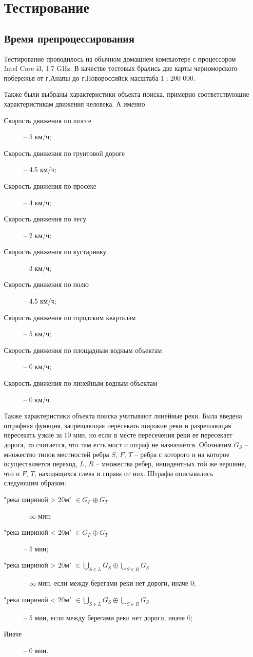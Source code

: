 \chapter{Тестирование}

\section{Время препроцессирования}

Тестирование проводилось на обычном домашнем компьютере
с процессором Intel Core i3, 1.7 GHz. В качестве тестовых
брались две карты черноморского побережья от г.Анапы до г.Новороссийск
масштаба 1 : 200 000.

Также были выбраны характеристики объекта поиска, примерно соответствующие
характеристикам движения человека. А именно
\begin{description}
\item[Скорость движения по шоссе] -- 5 км/ч;
\item[Скорость движения по грунтовой дороге] -- 4.5 км/ч;
\item[Скорость движения по просеке] -- 4 км/ч;
\item[Скорость движения по лесу] -- 2 км/ч;
\item[Скорость движения по кустарнику] -- 3 км/ч;
\item[Скорость движения по полю] -- 4.5 км/ч;
\item[Скорость движения по городским кварталам] -- 5 км/ч;
\item[Скорость движения по площадным водным объектам] -- 0 км/ч;
\item[Скорость движения по линейным водным объектам] -- 0 км/ч.
\end{description}

Также характеристики объекта поиска учитывают линейные реки.
Была введена штрафная функция, запрещающая пересекать широкие
реки и разрешающая пересекать узкие за 10 мин, но если в
месте пересечения реки ее пересекает дорога, то считается, что
там есть мост и штраф не назначается. Обозначим
$G_S$ -- множество типов местностей ребра $S$, $F$, $T$ --
ребра с которого и на которое осуществляется переход,
$L$, $R$ -- множества ребер, инцидентных той же вершине, что и
$F$, $T$, находящихся слева и справа от них.
Штрафы описывались следующим образом:
\begin{description}
\item["река шириной > 20м" $\in G_F \oplus G_T$] -- $\infty$ мин;
\item["река шириной < 20м" $\in G_F \oplus G_T$] -- 5 мин;
\item["река шириной > 20м" $\displaystyle\in \bigcup_{S\in L}G_S \oplus \bigcup_{S\in R}G_S$]
-- $\infty$ мин, если между берегами реки нет дороги, иначе 0;
\item["река шириной < 20м" $\displaystyle\in \bigcup_{S\in L}G_S \oplus \bigcup_{S\in R}G_S$]
-- 5 мин, если между берегами реки нет дороги, иначе 0;
\item[Иначе] -- 0 мин.
\end{description}


